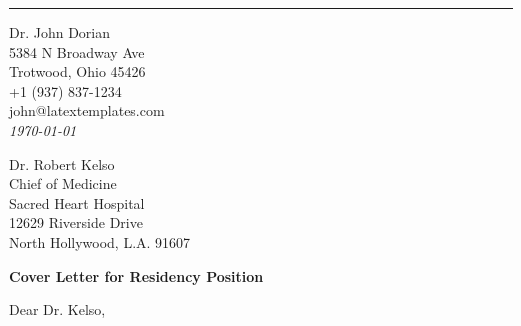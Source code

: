 \documentclass[
	12pt, %
]{letter}
\begin{document}

\vspace*{-1.25cm} %


\vspace{-0.5cm} %

\rule{\linewidth}{1pt} %

\medskip %


\begingroup
	\raggedleft %
	\small %
	Dr. John Dorian \\ %
	5384 N Broadway Ave \\ %
	Trotwood, Ohio 45426 \\
	+1 (937) 837-1234 \\ %
	john@latextemplates.com\\ %
	\bigskip %
	{\normalsize\textit{\today}}\\ %
\endgroup


\begingroup
	Dr. Robert Kelso \\
	Chief of Medicine \\
	Sacred Heart Hospital \\
	12629 Riverside Drive \\
	North Hollywood, L.A. 91607
\endgroup

\bigskip %

\textbf{Cover Letter for Residency Position}

\medskip %

Dear Dr. Kelso,

\smallskip %
\end{document}
